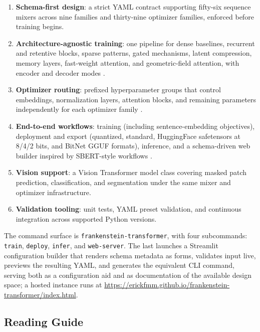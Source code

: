 \begin{enumerate}[leftmargin=*]
    \item \textbf{Schema-first design}: a strict YAML contract supporting fifty-six sequence mixers across nine families and thirty-nine optimizer families, enforced before training begins.
    \item \textbf{Architecture-agnostic training}: one pipeline for dense baselines, recurrent and retentive blocks, sparse patterns, gated mechanisms, latent compression, memory layers, fast-weight attention, and geometric-field attention, with encoder and decoder modes \citep{zhu2026mixtureofdepthsattention,cheng2026conditionalmemoryscalablelookup,xie_mhc_2025,zhang_falcon_2026,pisoni_ssog_2026}.
    \item \textbf{Optimizer routing}: prefixed hyperparameter groups that control embeddings, normalization layers, attention blocks, and remaining parameters independently for each optimizer family \citep{zhu2025apollosgdlikememoryadamwlevel}.
    \item \textbf{End-to-end workflows}: training (including sentence-embedding objectives), deployment and export (quantized, standard, HuggingFace safetensors at 8/4/2 bits, and BitNet GGUF formats), inference, and a schema-driven web builder inspired by SBERT-style workflows \citep{reimers_sentence-bert_2019}.
    \item \textbf{Vision support}: a Vision Transformer model class covering masked patch prediction, classification, and segmentation under the same mixer and optimizer infrastructure.
    \item \textbf{Validation tooling}: unit tests, YAML preset validation, and continuous integration across supported Python versions.
\end{enumerate}

The command surface is \texttt{frankenstein-transformer}, with four subcommands: \texttt{train}, \texttt{deploy}, \texttt{infer}, and \texttt{web-server}. The last launches a Streamlit configuration builder that renders schema metadata as forms, validates input live, previews the resulting YAML, and generates the equivalent CLI command, serving both as a configuration aid and as documentation of the available design space; a hosted instance runs at \url{https://erickfmm.github.io/frankenstein-transformer/index.html}.

\subsection{Reading Guide}

